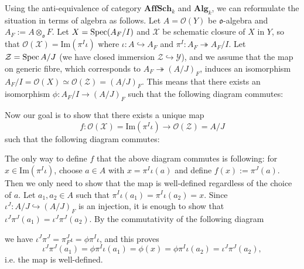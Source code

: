 \begin{problem} Using the anti-equivalence of category $\mathbf{AffSch}_{k}$ and $\mathbf{Alg}_{k}$,
we can reformulate the situation in terms of algebra as follows.
Let $A = \mathcal{O}(Y)$ be $\mathfrak{o}$-algebra and $A_F:= A\otimes_{\mathfrak{o}} F$.
Let $X = \operatorname{\mathrm{Spec}} (A_F/I)$ and $\mathcal{X}$ be schematic closure of $X$ in $Y$, so that
$\mathcal{O}(\mathcal{X}) = \mathrm{Im}(\pi^{I}\iota)$ where $\iota: A\hookrightarrow A_F$ and $\pi^{I}: A_F \twoheadrightarrow A_F / I$.
Let $\mathcal{Z} = \operatorname{\mathrm{Spec}} A/J$ (we have closed immersion $\mathcal{Z} \hookrightarrow \mathcal{Y}$),
and we assume that the map on generic fibre, which corresponds to $A_F \twoheadrightarrow (A/J)_F$, induces an isomorphism
$A_F / I = \mathcal{O}(X) \simeq \mathcal{O}(\mathcal{Z}) = (A/J)_F$.
This means that there exists an isomorphism $\phi: A_F/I \to (A/J)_F$ such that the following diagram commutes:
\begin{center}
\end{center}
Now our goal is to show that there exists a unique map
$$
f: \mathcal{O}(\mathcal{X}) = \mathrm{Im}(\pi^{I}\iota) \to \mathcal{O}(\mathcal{Z}) = A/J
$$
such that the following diagram commutes:
\begin{center}
\end{center}
The only way to define $f$ that the above diagram commutes is following: for $x \in \mathrm{Im}(\pi^{I}\iota)$, 
choose $a\in A$ with $x = \pi^{I}\iota(a)$ and define $f(x):= \pi^{J}(a)$.
Then we only need to show that the map is well-defined regardless of the choice of $a$.
Let $a_{1}, a_{2} \in A$ such that $\pi^{I}\iota(a_1) = \pi^{I}\iota(a_2) = x$.
Since $\iota^{J}: A/J \hookrightarrow (A/J)_F$ is an injection, it is enough to show that $\iota^{J}\pi^{J}(a_1) =\iota^{J}\pi^{J}(a_2)$.
By the commutativity of the following diagram
\begin{center}
\end{center}
we have $\iota^{J}\pi^{J} = \pi_{F}^{J} \iota = \phi\pi^{I}\iota$, and this proves
$$
\iota^{J}\pi^{J}(a_1) = \phi\pi^{I}\iota(a_1) = \phi(x) = \phi\pi^{I}\iota(a_2) = \iota^{J}\pi^{J}(a_2),
$$
i.e. the map is well-defined.

\end{problem}
